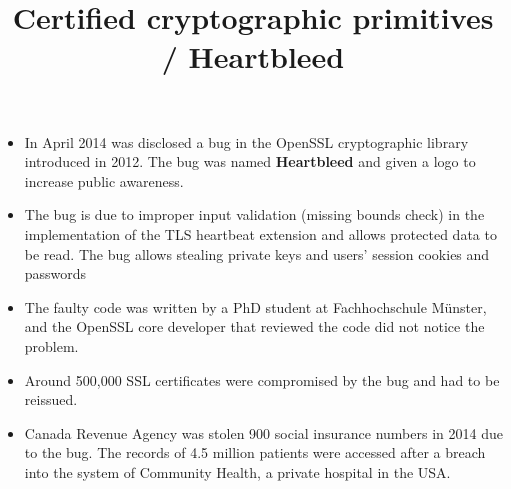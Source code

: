 \documentclass[wide]{slides}
\begin{document}
\begin{slide}
  \title{Certified cryptographic primitives / Heartbleed}

  \begin{itemize}

    \item In April 2014 was disclosed a bug in the OpenSSL
      cryptographic library introduced in 2012. The bug was named
      \textbf{Heartbleed} and given a logo to increase public
      awareness.

    \item The bug is due to improper input validation (missing bounds
      check) in the implementation of the TLS heartbeat extension and
      allows protected data to be read.  The bug allows stealing
      private keys and users' session cookies and passwords

    \item The faulty code was written by a PhD student at
      Fachhochschule Münster, and the OpenSSL core developer that
      reviewed the code did not notice the problem.

    \item Around 500,000 SSL certificates were compromised by the bug
      and had to be reissued.

    \item Canada Revenue Agency was stolen 900 social insurance
      numbers in 2014 due to the bug. The records of 4.5 million
      patients were accessed after a breach into the system of
      Community Health, a private hospital in the USA.

  \end{itemize}

\end{slide}
\end{document}
